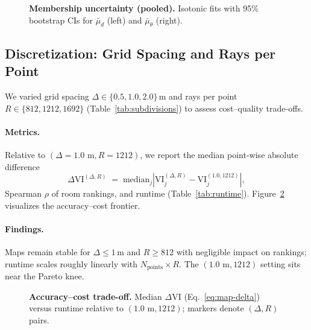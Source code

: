 \documentclass[final,3p,times,review]{elsarticle}
\begin{document}
\begin{figure}[H]
\centering
\caption{\textbf{Membership uncertainty (pooled).} Isotonic fits with 95\% bootstrap CIs for $\bar{\mu}_d$ (left) and $\bar{\mu}_\theta$ (right).}
\label{fig:mf-uncertainty}
\end{figure}

\subsection{Discretization: Grid Spacing and Rays per Point}
We varied grid spacing $\Delta\in\{0.5,1.0,2.0\}$\,m and rays per point $R\in\{812,1212,1692\}$ (Table~\ref{tab:subdivisions}) to assess cost--quality trade-offs.

\paragraph{Metrics.}
Relative to $(\Delta{=}1.0\text{ m}, R{=}1212)$, we report the median point-wise absolute difference
\begin{equation}
\Delta \mathrm{VI}^{(\Delta,R)} \;=\; \mathrm{median}_j \left| \mathrm{VI}_j^{(\Delta,R)} - \mathrm{VI}_j^{(1.0,1212)} \right|,
\label{eq:map-delta}
\end{equation}
Spearman $\rho$ of room rankings, and runtime (Table~\ref{tab:runtime}). Figure~\ref{fig:discretization-tradeoff} visualizes the accuracy--cost frontier.

\paragraph{Findings.}
Maps remain stable for $\Delta\le1$\,m and $R\ge812$ with negligible impact on rankings; runtime scales roughly linearly with $N_\text{points}\times R$. The $(1.0\text{ m}, 1212)$ setting sits near the Pareto knee.

\begin{figure}[H]
\centering
\caption{\textbf{Accuracy--cost trade-off.} Median $\Delta \mathrm{VI}$ (Eq.~\ref{eq:map-delta}) versus runtime relative to $(1.0\text{ m},1212)$; markers denote $(\Delta,R)$ pairs.}
\label{fig:discretization-tradeoff}
\end{figure}
\end{document}
